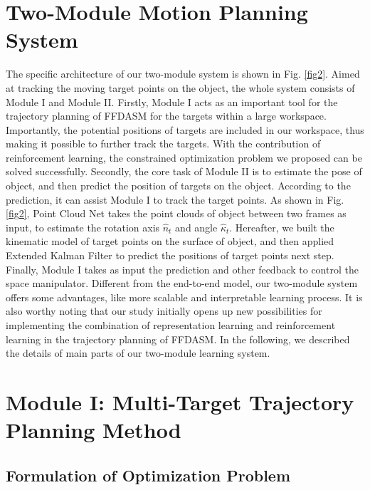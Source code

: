\documentclass{article}
\begin{document}
\section{Two-Module Motion Planning System} 


The specific architecture of our two-module system is shown in Fig. \ref{fig2}. Aimed at tracking the moving target points on the object, the whole system consists of Module I and Module II. Firstly, Module I acts as an important tool for the trajectory planning of FFDASM for the targets within a large workspace. Importantly, the potential positions of targets are included in our workspace, thus making it possible to further track the targets. With the contribution of reinforcement learning, the constrained optimization problem we proposed can be solved successfully. Secondly, the core task of Module II is to estimate the pose of object, and then predict the position of targets on the object. According to the prediction, it can assist Module I to track the target points. As shown in Fig. \ref{fig2}, Point Cloud Net takes the point clouds of object between two frames as input, to estimate the rotation axis $\hat{n}_t$ and angle  $ \hat{\kappa}_t$.  Hereafter, we built the kinematic model of target points on the surface of object, and then applied Extended Kalman Filter to predict the positions of target points next step. Finally, Module I takes as input the prediction and other feedback to control the space manipulator. Different from the end-to-end model, our two-module system offers some advantages, like more scalable and interpretable learning process. It is also worthy noting that our study initially opens up new possibilities for implementing the combination of representation learning and reinforcement learning in the trajectory planning of FFDASM. In the following, we described the details of main parts of our two-module learning system. 

\section{Module I: Multi-Target Trajectory Planning Method}

\subsection{Formulation of Optimization Problem}
\end{document}
